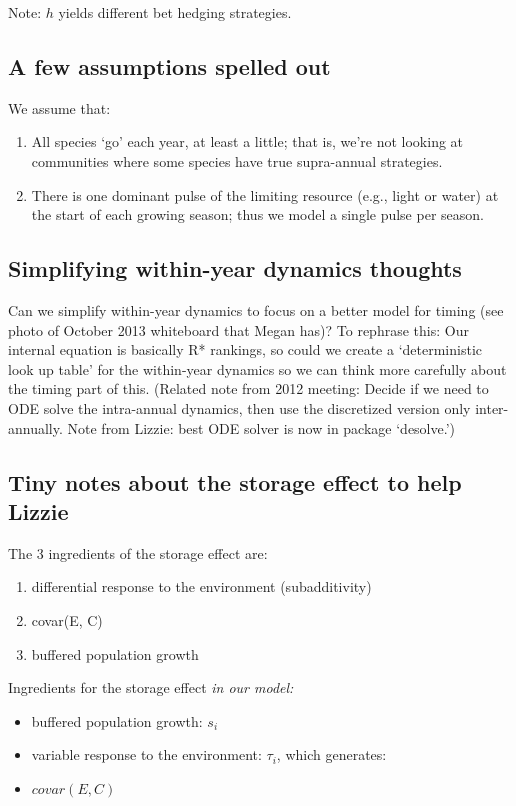 \documentclass[11pt,a4paper,oneside]{article}
\begin{document}
\noindent Note: \(h\) yields different bet hedging strategies.

\subsection{A few assumptions spelled out}
\noindent We assume that:
\begin{enumerate}
\item All species `go' each year, at least a little; that is, we're
  not looking at communities where some species have true
  supra-annual strategies.
\item There is one dominant pulse of the limiting resource (e.g.,
  light or water) at the
  start of each growing season; thus we model a  single pulse per
  season.
\end{enumerate}

\subsection{Simplifying within-year dynamics thoughts}
Can we simplify within-year dynamics to focus on a better model for timing (see photo of October 2013 whiteboard that Megan has)? To rephrase this: Our internal equation is basically R* rankings, so could we create a `deterministic look up table' for the within-year dynamics so we can think more carefully about the timing part of this.  (Related note from 2012 meeting: Decide if we need to ODE solve the intra-annual
  dynamics, then use the discretized version only inter-annually. Note from Lizzie: best ODE solver is now in package `desolve.')\\


\subsection{Tiny notes about the storage effect to help Lizzie}
\noindent The 3 ingredients of the storage effect are:
\begin{enumerate}
\item differential response to the environment (subadditivity)
\item covar(E, C)
\item buffered population growth
\end{enumerate}

\noindent Ingredients for the storage effect \emph{in our model:}
\begin{itemize}
\item buffered population growth: \(s_{i}\)
\item variable response to the environment: \(\tau_{i}\), which generates:
\item \(covar(E,C)\)
\end{itemize}
\end{document}
